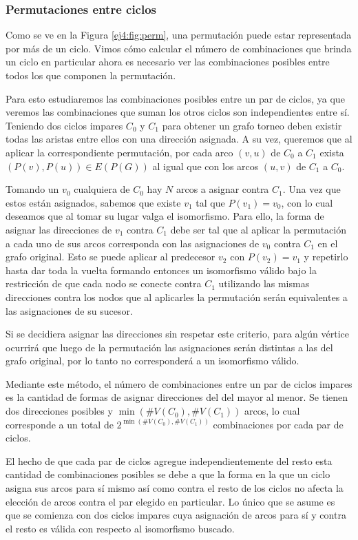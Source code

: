 \subsubsection{Permutaciones entre ciclos} \label{ej4:sec:paresciclos}

Como se ve en la Figura \ref{ej4:fig:perm}, una permutación puede estar
representada por más de un ciclo. Vimos cómo calcular el número de combinaciones
que brinda un ciclo en particular ahora es necesario ver las combinaciones
posibles entre todos los que componen la permutación.

Para esto estudiaremos las combinaciones posibles entre un par de ciclos, ya que
veremos las combinaciones que suman los otros ciclos son independientes entre
sí. Teniendo dos ciclos impares $C_0$ y $C_1$ para obtener un grafo torneo deben
existir todas las aristas entre ellos con una dirección asignada. A su vez,
queremos que al aplicar la correspondiente permutación, por cada arco $(v, u)$
de $C_0$ a $C_1$ exista $(P(v), P(u)) \in E(P(G))$ al igual que con los
arcos $(u, v)$ de $C_1$ a $C_0$.

Tomando un $v_0$ cualquiera de $C_0$ hay $N$ arcos a asignar contra $C_1$. Una vez
que estos están asignados, sabemos que existe $v_1$ tal que $P(v_1) = v_0$, con
lo cual deseamos que al tomar su lugar valga el isomorfismo. Para ello, la forma
de asignar las direcciones de $v_1$ contra $C_1$ debe ser tal que al aplicar la
permutación a cada uno de sus arcos corresponda con las asignaciones de $v_0$
contra $C_1$ en el grafo original. Esto se puede aplicar al predecesor $v_2$ con
$P(v_2) = v_1$ y repetirlo hasta dar toda la vuelta formando entonces un
isomorfismo válido bajo la restricción de que cada nodo se conecte contra $C_1$
utilizando las mismas direcciones contra los nodos que al aplicarles la
permutación serán equivalentes a las asignaciones de su sucesor.

Si se decidiera asignar las direcciones sin respetar este criterio, para algún
vértice ocurrirá que luego de la permutación las asignaciones serán distintas a
las del grafo original, por lo tanto no corresponderá a un isomorfismo válido.

Mediante este método, el número de combinaciones entre un par de ciclos impares
es la cantidad de formas de asignar direcciones del del mayor al menor. Se
tienen dos direcciones posibles y $\min(\#V(C_0), \#V(C_1))$ arcos, lo cual
corresponde a un total de $2^{\min(\#V(C_0), \#V(C_1))}$ combinaciones por cada
par de ciclos.

El hecho de que cada par de ciclos agregue independientemente del resto esta
cantidad de combinaciones posibles se debe a que la forma en la que un ciclo
asigna sus arcos para sí mismo así como contra el resto de los ciclos no afecta
la elección de arcos contra el par elegido en particular. Lo único que se asume
es que se comienza con dos ciclos impares cuya asignación de arcos para sí y
contra el resto es válida con respecto al isomorfismo buscado.

